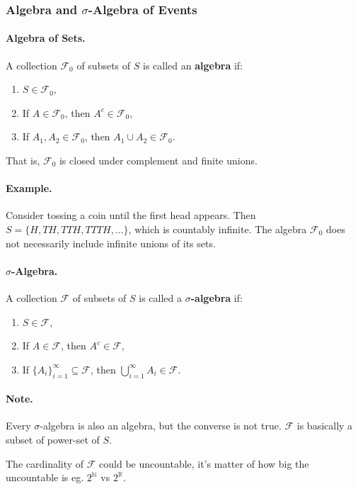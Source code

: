 \subsubsection{Algebra and $\sigma$-Algebra of Events}

\paragraph{Algebra of Sets.}
A collection $\mathcal{F}_0$ of subsets of $S$ is called an \textbf{algebra} if:
\begin{enumerate}
    \item $S \in \mathcal{F}_0$,
    \item If $A \in \mathcal{F}_0$, then $A^c \in \mathcal{F}_0$,
    \item If $A_1, A_2 \in \mathcal{F}_0$, then $A_1 \cup A_2 \in \mathcal{F}_0$.
\end{enumerate}
That is, $\mathcal{F}_0$ is closed under complement and finite unions.

\paragraph{Example.}
Consider tossing a coin until the first head appears.  
Then $S = \{H, TH, TTH, TTTH, \ldots\}$, which is countably infinite.  
The algebra $\mathcal{F}_0$ does not necessarily include infinite unions of its sets.

\paragraph{$\sigma$-Algebra.}
A collection $\mathcal{F}$ of subsets of $S$ is called a \textbf{$\sigma$-algebra} if:
\begin{enumerate}
    \item $S \in \mathcal{F}$,
    \item If $A \in \mathcal{F}$, then $A^c \in \mathcal{F}$,
    \item If $\{A_i\}_{i=1}^\infty \subseteq \mathcal{F}$, then $\bigcup_{i=1}^\infty A_i \in \mathcal{F}$.
\end{enumerate}

\paragraph{Note.}
Every $\sigma$-algebra is also an algebra, but the converse is not true. $\mathcal{F}$ is basically a subset of power-set of $S$.

\noindent
The cardinality of $\mathcal{F}$ could be uncountable, it's matter of how big the uncountable is eg. $2^\mathbb{N}$ vs $2^\mathbb{R}$.



